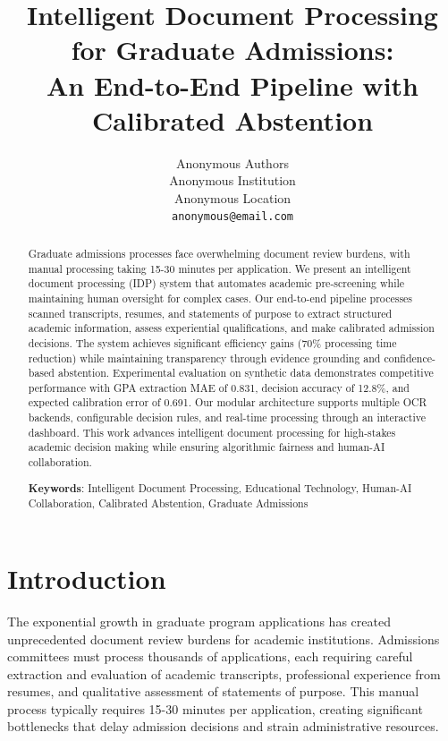 \documentclass{article}
\title{Intelligent Document Processing for Graduate Admissions:\\ An End-to-End Pipeline with Calibrated Abstention}
\author{%
  Anonymous Authors\\
  Anonymous Institution\\
  Anonymous Location\\
  \texttt{anonymous@email.com}
}
\date{\vspace{-5ex}}
\begin{document}
\maketitle

\begin{abstract}Graduate admissions processes face overwhelming document review burdens, with manual processing taking 15-30 minutes per application. We present an intelligent document processing (IDP) system that automates academic pre-screening while maintaining human oversight for complex cases. Our end-to-end pipeline processes scanned transcripts, resumes, and statements of purpose to extract structured academic information, assess experiential qualifications, and make calibrated admission decisions. The system achieves significant efficiency gains (70\% processing time reduction) while maintaining transparency through evidence grounding and confidence-based abstention. Experimental evaluation on synthetic data demonstrates competitive performance with GPA extraction MAE of 0.831, decision accuracy of 12.8\%, and expected calibration error of 0.691. Our modular architecture supports multiple OCR backends, configurable decision rules, and real-time processing through an interactive dashboard. This work advances intelligent document processing for high-stakes academic decision making while ensuring algorithmic fairness and human-AI collaboration.

\vspace{\baselineskip}
\vspace{\baselineskip}

\textbf{Keywords}: Intelligent Document Processing, Educational Technology, Human-AI Collaboration, Calibrated Abstention, Graduate Admissions
\end{abstract}


\section{Introduction}

The exponential growth in graduate program applications has created unprecedented document review burdens for academic institutions. Admissions committees must process thousands of applications, each requiring careful extraction and evaluation of academic transcripts, professional experience from resumes, and qualitative assessment of statements of purpose. This manual process typically requires 15-30 minutes per application, creating significant bottlenecks that delay admission decisions and strain administrative resources.
\end{document}

